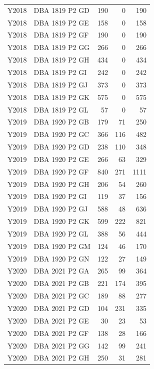 \begin{longtable}{llrrr}
Y2018 & DBA 1819 P2 GD &   190 &       0 &  190 \\
Y2018 & DBA 1819 P2 GE &   158 &       0 &  158 \\
Y2018 & DBA 1819 P2 GF &   190 &       0 &  190 \\
Y2018 & DBA 1819 P2 GG &   266 &       0 &  266 \\
Y2018 & DBA 1819 P2 GH &   434 &       0 &  434 \\
Y2018 & DBA 1819 P2 GI &   242 &       0 &  242 \\
Y2018 & DBA 1819 P2 GJ &   373 &       0 &  373 \\
Y2018 & DBA 1819 P2 GK &   575 &       0 &  575 \\
Y2018 & DBA 1819 P2 GL &    57 &       0 &   57 \\
Y2019 & DBA 1920 P2 GB &   179 &      71 &  250 \\
Y2019 & DBA 1920 P2 GC &   366 &     116 &  482 \\
Y2019 & DBA 1920 P2 GD &   238 &     110 &  348 \\
Y2019 & DBA 1920 P2 GE &   266 &      63 &  329 \\
Y2019 & DBA 1920 P2 GF &   840 &     271 & 1111 \\
Y2019 & DBA 1920 P2 GH &   206 &      54 &  260 \\
Y2019 & DBA 1920 P2 GI &   119 &      37 &  156 \\
Y2019 & DBA 1920 P2 GJ &   588 &      48 &  636 \\
Y2019 & DBA 1920 P2 GK &   599 &     222 &  821 \\
Y2019 & DBA 1920 P2 GL &   388 &      56 &  444 \\
Y2019 & DBA 1920 P2 GM &   124 &      46 &  170 \\
Y2019 & DBA 1920 P2 GN &   122 &      27 &  149 \\
Y2020 & DBA 2021 P2 GA &   265 &      99 &  364 \\
Y2020 & DBA 2021 P2 GB &   221 &     174 &  395 \\
Y2020 & DBA 2021 P2 GC &   189 &      88 &  277 \\
Y2020 & DBA 2021 P2 GD &   104 &     231 &  335 \\
Y2020 & DBA 2021 P2 GE &    30 &      23 &   53 \\
Y2020 & DBA 2021 P2 GF &   138 &      28 &  166 \\
Y2020 & DBA 2021 P2 GG &   142 &      99 &  241 \\
Y2020 & DBA 2021 P2 GH &   250 &      31 &  281 \\

\end{longtable}
